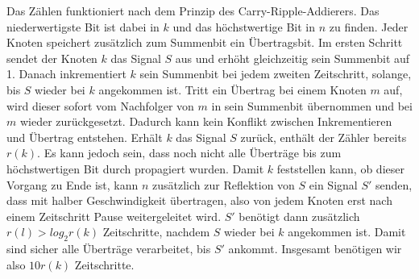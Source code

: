 \documentclass[11pt]{article}
\begin{document}
Das Zählen funktioniert nach dem Prinzip des Carry-Ripple-Addierers. 
Das niederwertigste Bit ist dabei in $k$ und das höchstwertige Bit in $n$ zu finden.
Jeder Knoten speichert zusätzlich zum Summenbit ein Übertragsbit. Im ersten Schritt sendet der Knoten $k$ das Signal $S$ aus und erhöht gleichzeitig sein Summenbit auf 1. Danach inkrementiert $k$ sein Summenbit bei jedem zweiten Zeitschritt, solange, bis $S$ wieder bei $k$ angekommen ist. 
Tritt ein Übertrag bei einem Knoten $m$ auf, wird dieser sofort vom Nachfolger von $m$ in sein Summenbit übernommen und bei $m$ wieder zurückgesetzt.
Dadurch kann kein Konflikt zwischen Inkrementieren und Übertrag entstehen.
Erhält $k$ das Signal $S$ zurück, enthält der Zähler bereits $r(k)$. 
Es kann jedoch sein, dass noch nicht alle Überträge bis zum höchstwertigen Bit durch propagiert wurden. 
Damit $k$ feststellen kann, ob dieser Vorgang zu Ende ist, kann $n$ zusätzlich zur Reflektion von $S$ ein Signal $S'$ senden, dass mit halber Geschwindigkeit übertragen, also von jedem Knoten erst nach einem Zeitschritt Pause weitergeleitet wird.
$S'$ benötigt dann zusätzlich $r(l) > log_2 r(k)$ Zeitschritte, nachdem $S$ wieder bei $k$ angekommen ist. 
Damit sind sicher alle Überträge verarbeitet, bis $S'$ ankommt.
Insgesamt benötigen wir also $10r(k)$ Zeitschritte.
\end{document}
